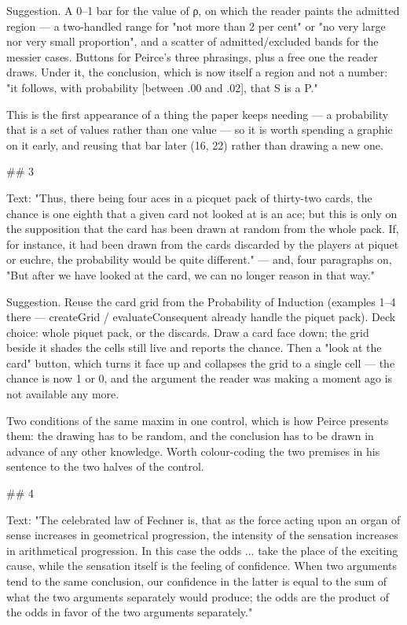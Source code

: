 Suggestion. A 0–1 bar for the value of ρ, on which the reader paints the
admitted region — a two-handled range for "not more than 2 per cent" or "no very
large nor very small proportion", and a scatter of admitted/excluded bands for
the messier cases. Buttons for Peirce's three phrasings, plus a free one the
reader draws. Under it, the conclusion, which is now itself a region and not a
number: "it follows, with probability [between .00 and .02], that S is a P."

This is the first appearance of a thing the paper keeps needing — a probability
that is a set of values rather than one value — so it is worth spending a
graphic on it early, and reusing that bar later (16, 22) rather than drawing a
new one.


## 3

Text: "Thus, there being four aces in a picquet pack of thirty-two cards, the
chance is one eighth that a given card not looked at is an ace; but this is only
on the supposition that the card has been drawn at random from the whole pack.
If, for instance, it had been drawn from the cards discarded by the players at
piquet or euchre, the probability would be quite different." — and, four
paragraphs on, "But after we have looked at the card, we can no longer reason in
that way."

Suggestion. Reuse the card grid from the Probability of Induction (examples 1–4
there — createGrid / evaluateConsequent already handle the piquet pack). Deck
choice: whole piquet pack, or the discards. Draw a card face down; the grid
beside it shades the cells still live and reports the chance. Then a "look at
the card" button, which turns it face up and collapses the grid to a single
cell — the chance is now 1 or 0, and the argument the reader was making a moment
ago is not available any more.

Two conditions of the same maxim in one control, which is how Peirce presents
them: the drawing has to be random, and the conclusion has to be drawn in
advance of any other knowledge. Worth colour-coding the two premises in his
sentence to the two halves of the control.


## 4

Text: "The celebrated law of Fechner is, that as the force acting upon an organ
of sense increases in geometrical progression, the intensity of the sensation
increases in arithmetical progression. In this case the odds ... take the place
of the exciting cause, while the sensation itself is the feeling of confidence.
When two arguments tend to the same conclusion, our confidence in the latter is
equal to the sum of what the two arguments separately would produce; the odds
are the product of the odds in favor of the two arguments separately."

